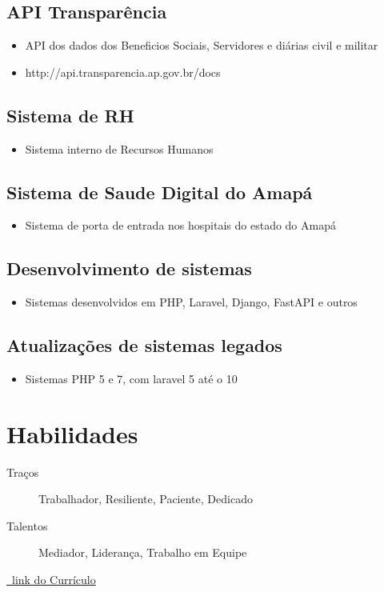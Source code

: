 \documentclass{article}
\begin{document}
\subsection{API Transparência}
\begin{itemize}
  \item API dos dados dos Beneficios Sociais, Servidores e diárias civil e militar
  \item http://api.transparencia.ap.gov.br/docs
\end{itemize}

\subsection{Sistema de RH}
\begin{itemize}
  \item Sistema interno de Recursos Humanos
\end{itemize}

\subsection{Sistema de Saude Digital do Amapá}
\begin{itemize}
  \item Sistema de porta de entrada nos hospitais do estado do Amapá
\end{itemize}

\subsection{Desenvolvimento de sistemas}
\begin{itemize}
  \item Sistemas desenvolvidos em PHP, Laravel, Django, FastAPI e outros 
\end{itemize}

\subsection{Atualizações de sistemas legados}
\begin{itemize}
  \item Sistemas PHP 5 e 7, com laravel 5 até o 10
\end{itemize}



\section{\faCogs\enspace Habilidades}
\begin{description}
  \item[Traços] Trabalhador, Resiliente, Paciente, Dedicado
  \item[Talentos] Mediador, Liderança, Trabalho em Equipe 
\end{description}

\href{https://github.com/PedroPaulo-98}{\faGithub\ link do Currículo}
\end{document}

